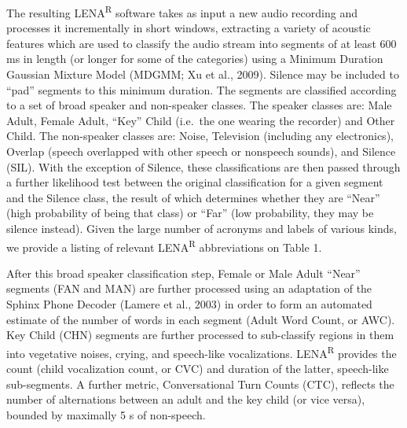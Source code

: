 \documentclass[english,table,man,floatsintext]{apa6}
\begin{document}
The resulting LENA\textsuperscript{R} software takes as input a new audio recording and processes it incrementally in short windows, extracting a variety of acoustic features which are used to classify the audio stream into segments of at least 600 ms in length (or longer for some of the categories) using a Minimum Duration Gaussian Mixture Model (MDGMM; Xu et al., 2009). Silence may be included to \enquote{pad} segments to this minimum duration. The segments are classified according to a set of broad speaker and non-speaker classes. The speaker classes are: Male Adult, Female Adult, \enquote{Key} Child (i.e.~the one wearing the recorder) and Other Child. The non-speaker classes are: Noise, Television (including any electronics), Overlap (speech overlapped with other speech or nonspeech sounds), and Silence (SIL). With the exception of Silence, these classifications are then passed through a further likelihood test between the original classification for a given segment and the Silence class, the result of which determines whether they are \enquote{Near} (high probability of being that class) or \enquote{Far} (low probability, they may be silence instead). Given the large number of acronyms and labels of various kinds, we provide a listing of relevant LENA\textsuperscript{R} abbreviations on Table 1.

After this broad speaker classification step, Female or Male Adult \enquote{Near} segments (FAN and MAN) are further processed using an adaptation of the Sphinx Phone Decoder (Lamere et al., 2003) in order to form an automated estimate of the number of words in each segment (Adult Word Count, or AWC). Key Child (CHN) segments are further processed to sub-classify regions in them into vegetative noises, crying, and speech-like vocalizations. LENA\textsuperscript{R} provides the count (child vocalization count, or CVC) and duration of the latter, speech-like sub-segments. A further metric, Conversational Turn Counts (CTC), reflects the number of alternations between an adult and the key child (or vice versa), bounded by maximally 5 s of non-speech.
\end{document}
